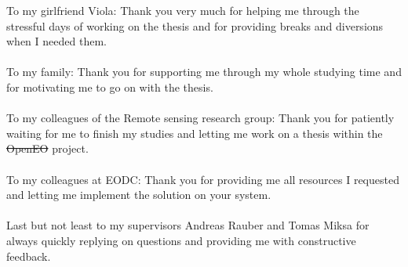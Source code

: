 \documentclass[draft,final]{vutinfth} %
\providecommand{\DIFaddtex}[1]{{\protect\color{blue}\uwave{#1}}} %
\providecommand{\DIFdeltex}[1]{{\protect\color{red}\sout{#1}}}                      %
\providecommand{\DIFaddbegin}{} %
\providecommand{\DIFaddend}{} %
\providecommand{\DIFdelbegin}{} %
\providecommand{\DIFdelend}{} %
\providecommand{\DIFadd}[1]{\texorpdfstring{\DIFaddtex{#1}}{#1}} %
\providecommand{\DIFdel}[1]{\texorpdfstring{\DIFdeltex{#1}}{}} %
\begin{document}
\frontmatter %

\addstatementpage




\begin{acknowledgements*}
To my girlfriend Viola: Thank you very much for helping me through the stressful days of working on the thesis and for providing breaks and diversions when I needed them.\\ \\
To my family: Thank you for supporting me through my whole studying time and for motivating me to go on with the thesis. \\ \\
To my colleagues of the Remote sensing research group: Thank you for patiently waiting for me to finish my studies and letting me work on a thesis within the \DIFdelbegin \DIFdel{OpenEO }\DIFdelend \DIFaddbegin \DIFadd{openEO }\DIFaddend project. \\ \\
To my colleagues at EODC: Thank you for providing me all resources I requested and letting me implement the solution on your system. \\ \\
Last but not least to my supervisors Andreas Rauber and Tomas Miksa for always quickly replying on questions and providing me with constructive feedback. 
\end{acknowledgements*}
\end{document}
